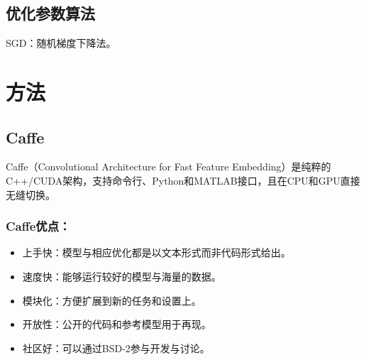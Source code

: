 \documentclass[12pt]{article}
\begin{document}
\subsection{优化参数算法}
SGD：随机梯度下降法。


\section{方法}
\subsection{Caffe}
Caffe（Convolutional Architecture for Fast Feature Embedding）是纯粹的C++/CUDA架构，支持命令行、Python和MATLAB接口，且在CPU和GPU直接无缝切换。
\subsubsection{Caffe优点：}
\begin{itemize}
\item 上手快：模型与相应优化都是以文本形式而非代码形式给出。
\item 速度快：能够运行较好的模型与海量的数据。
\item 模块化：方便扩展到新的任务和设置上。
\item 开放性：公开的代码和参考模型用于再现。
\item 社区好：可以通过BSD-2参与开发与讨论。
\end{itemize}
\end{document}
